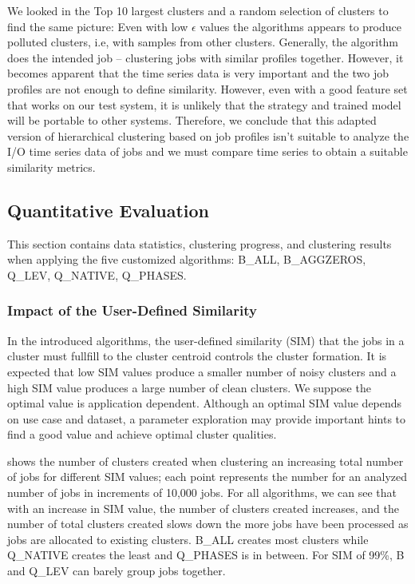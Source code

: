 \documentclass{jhps}
\begin{document}
We looked in the Top 10 largest clusters and a random selection of clusters to find the same picture:
Even with low $\epsilon$ values the algorithms appears to produce polluted clusters, i.e, with samples from other clusters.
Generally, the algorithm does the intended job -- clustering jobs with similar profiles together.
However, it becomes apparent that the time series data is very important and the two job profiles are not enough to define similarity.
However, even with a good feature set that works on our test system, it is unlikely that the strategy and trained model will be portable to other systems.
Therefore, we conclude that this adapted version of hierarchical clustering based on job profiles isn't suitable to analyze the I/O time series data of jobs and we must compare time series to obtain a suitable similarity metrics.

\subsection{Quantitative Evaluation}
This section contains data statistics, clustering progress, and clustering results when applying the five customized algorithms: B\_ALL,  B\_AGGZEROS, Q\_LEV, Q\_NATIVE, Q\_PHASES.

\subsubsection{Impact of the User-Defined Similarity}
In the introduced algorithms, the user-defined similarity (SIM) that the jobs in a cluster must fullfill to the cluster centroid controls the cluster formation.
It is expected that low SIM values produce a smaller number of noisy clusters and a high SIM value produces a large number of clean clusters.
We suppose the optimal value is application dependent.
Although an optimal SIM value depends on use case and dataset, a parameter exploration may provide important hints to find a good value and achieve optimal cluster qualities.

 shows the number of clusters created when clustering an increasing total number of jobs for different SIM values; each point represents the number for an analyzed number of jobs in increments of 10,000 jobs.
For all algorithms, we can see that with an increase in SIM value, the number of clusters created increases, and the number of total clusters created slows down the more jobs have been processed as jobs are allocated to existing clusters.
B\_ALL creates most clusters while Q\_NATIVE creates the least and Q\_PHASES is in between.
For SIM of 99\%, B and Q\_LEV can barely group jobs together.
\end{document}
